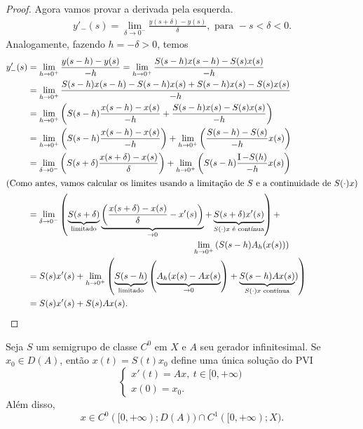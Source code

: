 \begin{proof}
Agora vamos provar a derivada pela esquerda.
\begin{align*}
y'_-(s)=\lim_{\delta\to 0^-}\frac{y(s+\delta)-y(s)}{\delta}, \text{ para } -s<\delta <0.
\end{align*}
Analogamente, fazendo $h=-\delta>0$, temos
\begin{align*}
y'_-(s)&=\lim_{h\to 0^+}\frac{y(s-h)-y(s)}{-h}
=\lim_{h\to 0^+}\frac{S(s-h)x(s-h)-S(s)x(s)}{-h}\\
& = \lim_{h\to 0^+}\frac{S(s-h)x(s-h)-S(s-h)x(s)+S(s-h)x(s)-S(s)x(s)}{-h}\\
& = \lim_{h\to 0^+}
\left(S(s-h)\frac{x(s-h)-x(s)}{-h}+\frac{S(s-h)x(s)-S(s)x(s)}{-h}
\right)\\
& = \lim_{h\to 0^+}
\left(S(s-h)\frac{x(s-h)-x(s)}{-h}\right)
+\lim_{h\to 0^+}\left(\frac{S(s-h)-S(s)}{-h}x(s)
\right)\\
& = \lim_{\delta\to 0^-}
\left(S(s+\delta)\frac{x(s+\delta)-x(s)}{\delta}\right)+
\lim_{h\to0^+}\left(S(s-h)\frac{\id- S(h)}{-h}x(s)
\right)\\
\shortintertext{(Como antes, vamos calcular os limites usando a limitação de $S$ e a continuidade de $S(\cdot)x$)}
&\begin{multlined}
= \lim_{\delta\to 0^-}
\left(\underbrace{S(s+\delta)}_{\text{limitado}}
\underbrace{\left(\frac{x(s+\delta)-x(s)}{\delta}-x'(s)\right)}_{\to 0}+\underbrace{S(s+\delta)x'(s)}_{S(\cdot)x \text{ é contínua}}
\right)+\\
\lim_{h\to0^+}\left(S(s-h)A_h(x(s))
\right)
\end{multlined} \\
&= S(s)x'(s)+\lim_{h\to0^+}\left(\underbrace{S(s-h)}_{\text{limitado}}
\left(\underbrace{A_h(x(s)-Ax(s)}_{\to 0}\right)+\underbrace{S(s-h)Ax(s)}_{S(\cdot)x \text{ contínua}})
\right)\\
& = S(s)x'(s)+S(s)Ax(s).
\end{align*}




\end{proof}

\begin{theorem}\label{PVI}

Seja $S$ um semigrupo de classe $C^0$ em $X$ e $A$ seu gerador infinitesimal. Se {$x_0\in D(A)$}, então $x(t)=S(t)x_0$ define {uma única solução} do PVI
\[
\begin{cases}
    x'(t)=Ax,\ t\in [0,+\infty)\\
    x(0)=x_0.
\end{cases}
\]
Além disso, \[x\in  C^0([0,+\infty);D(A))\cap C^1([0,+\infty);X).\]
\end{theorem}

